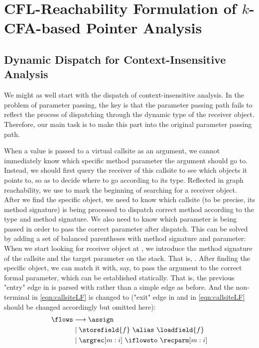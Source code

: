 \section{CFL-Reachability Formulation of $k$-CFA-based Pointer Analysis}
\label{sec:CFL}


\subsection{Dynamic Dispatch for Context-Insensitive Analysis}\label{sec:ddci}
We might as well start with the dispatch of context-insensitive analysis. In the problem of parameter passing, the key is that the parameter passing path fails to reflect the process of dispatching through the dynamic type of the receiver object. Therefore, our main task is to make this part into the original parameter passing path.

When a value is passed to a virtual callsite as an argument, we cannot immediately know which specific method parameter the argument should go to. Instead, we should first query the receiver of this callsite to see which objects it points to, so as to decide where to go according to its type. Reflected in graph reachability, we use \argrec to mark the beginning of searching for a receiver object. After we find the specific object, we need to know which callsite (to be precise, its method signature) is being processed to dispatch correct method according to the type and method signature. We also need to know which parameter is being passed in order to pass the correct parameter after dispatch. This can be solved by adding a set of balanced parentheses with method signature and parameter: When we start looking for receiver object at \argrec, we introduce the method signature of the callsite and the target parameter on the stack. That is, \argrec[m:i]. After finding the specific object, we can match it with, say, \recparm[m:i] to pass the argument to the correct formal parameter, which can be established statically. That is, the previous "entry" edge in  is parsed with \argrec[m:i] \iflowsto \recparm[m:i] rather than a simple \assign edge as before. And the non-terminal \flows in \cref{eqn:callsiteLF} is changed to ("exit" edge in  and \iflows in \cref{eqn:callsiteLF} should be changed accordingly but omitted here):
\begin{equation}
\label{eqn:newFlows}
\begin{split}
\flows & \longrightarrow \assign \\
    &\mid \storefield{f} \ \alias\ \loadfield{f} \\
    &\mid \argrec[m:i]\ \iflowsto\ \recparm[m:i]\\
\end{split}
\end{equation}

